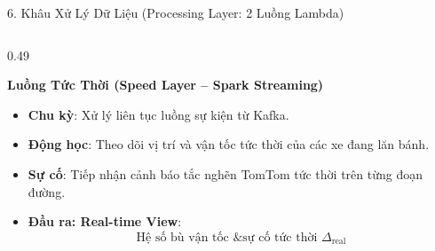\documentclass[aspectratio=169,10pt]{beamer}
\begin{document}
\begin{frame}{6. Khâu Xử Lý Dữ Liệu (Processing Layer: 2 Luồng Lambda)}
\begin{columns}[T]
    \begin{column}{0.49\textwidth}
        \begin{exampleblock}{\textbf{Luồng Tức Thời (Speed Layer -- Spark Streaming)}}
            \begin{itemize}\setlength{\itemsep}{2pt}\footnotesize
                \item \textbf{Chu kỳ}: Xử lý liên tục luồng sự kiện từ Kafka.
                \item \textbf{Động học}: Theo dõi vị trí và vận tốc tức thời của các xe đang lăn bánh.
                \item \textbf{Sự cố}: Tiếp nhận cảnh báo tắc nghẽn TomTom tức thời trên từng đoạn đường.
                \item \textbf{Đầu ra: Real-time View}:
                $$\text{Hệ số bù vận tốc \& sự cố tức thời } \Delta_{\text{real}}$$
            \end{itemize}
        \end{exampleblock}
        \vspace{2pt}
        \centering
    \end{column}
\end{columns}
\end{frame}
\end{document}
